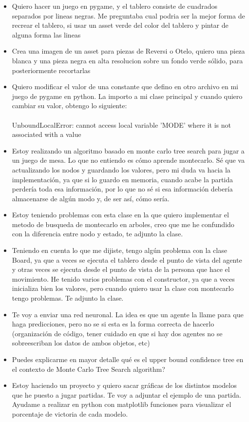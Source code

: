 \documentclass[conference,a4paper]{IEEEtran}
\begin{document}
\begin{itemize}
\item Quiero hacer un juego en pygame, y el tablero consiste de cuadrados 
separados por lineas negras. Me preguntaba cual podria ser la mejor forma 
de recrear el tablero, si usar un asset verde del color del tablero y pintar 
de alguna forma las lineas
\item Crea una imagen de un asset para piezas de Reversi o Otelo, quiero una 
pieza blanca y una pieza negra en alta resolucion sobre un fondo verde sólido, 
para posteriormente recortarlas
\item Quiero modificar el valor de una constante que defino en otro archivo 
en mi juego de pygame en python. La importo a mi clase principal y cuando quiero 
cambiar su valor, obtengo lo siguiente: \\ \\ UnboundLocalError: cannot access 
local variable 'MODE' where it is not associated with a value
\item Estoy realizando un algoritmo basado en monte carlo tree search para 
jugar a un juego de mesa. Lo que no entiendo es cómo aprende montecarlo. Sé 
que va actualizando los nodos y guardando los valores, pero mi duda va hacia 
la implementación, ya que si lo guardo en memoria, cuando acabe la partida 
perdería toda esa información, por lo que no sé si esa información debería 
almacenarse de algún modo y, de ser así, cómo sería.
\item Estoy teniendo problemas con esta clase en la que quiero implementar el 
metodo de busqueda de montecarlo en arboles, creo que me he confundido con la 
diferencia entre nodo y estado, te adjunto la clase.
\item Teniendo en cuenta lo que me dijiste, tengo algún problema con la clase 
Board, ya que a veces se ejecuta el tablero desde el punto de vista del agente 
y otras veces se ejecuta desde el punto de vista de la persona que hace el movimiento. 
He tenido varios problemas con el constructor, ya que a veces inicializa bien 
los valores, pero cuando quiero usar la clase con montecarlo tengo problemas. 
Te adjunto la clase.
\item Te voy a enviar una red neuronal. La idea es que un agente la llame para 
que haga predicciones, pero no se si esta es la forma correcta de hacerlo 
(organización de código, tener cuidado en que si hay dos agentes no se sobreescriban 
los datos de ambos objetos, etc)
\item Puedes explicarme en mayor detalle qué es el upper bound confidence tree
en el contexto de Monte Carlo Tree Search algorithm?
\item Estoy haciendo un proyecto y quiero sacar gráficas de los distintos 
modelos que he puesto a jugar partidas. Te voy a adjuntar el ejemplo de una 
partida. Ayudame a realizar en python con matplotlib funciones para visualizar 
el porcentaje de victoria de cada modelo. 

\end{itemize}
\end{document}
